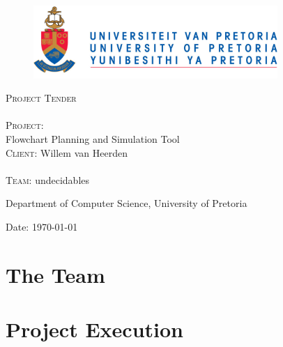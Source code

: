 \documentclass[12pt]{article}
\begin{document}
\begin{titlepage}
	\begin{center}
		
		\begin{figure}[t]
			\centering
			\includegraphics[width=350px]{UP_Logo.png}
		\end{figure}
		
		\textsc{\Huge Project Tender} \\ 

		\textsc{\huge \\Project:\\	}
		\huge Flowchart Planning and Simulation Tool
		\textsc{\Large \\Client:}
		\large Willem van Heerden \\

		\textsc{\huge \\ Team:}
		\huge \textsc{}undecidables\textsc{}
		
		\small Department of Computer Science, University of Pretoria \\

	\vfill

	{\large Date: \today}		
		
		
	\end{center}
\end{titlepage}

\pagebreak
\tableofcontents

\pagebreak

\section{The Team}

\pagebreak
\section{Project Execution}

\end{document}
